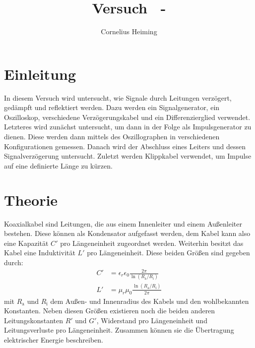 \documentclass[ngerman]{scrartcl}
\title{Versuch \nummer~-  \titel}
\date{\datum}
\author{Cornelius Heiming}
\theoremstyle{definition}
\begin{document}
	\maketitle
	
	
	\section{Einleitung}
		In diesem Versuch wird untersucht, wie Signale durch Leitungen verzögert, gedämpft und reflektiert werden. Dazu werden ein Signalgenerator, ein Oszilloskop, verschiedene Verzögerungskabel und ein Differenzierglied verwendet. Letzteres wird zunächst untersucht, um dann in der Folge als Impulsgenerator zu dienen. Diese werden dann mittels des Oszillographen in verschiedenen Konfigurationen gemessen. Danach wird der Abschluss eines Leiters und dessen Signalverzögerung untersucht. Zuletzt werden Klippkabel verwendet, um Impulse auf eine definierte Länge zu kürzen.
	
	
		\section{Theorie}
		
		Koaxialkabel sind Leitungen, die aus einem Innenleiter und einem Außenleiter bestehen. Diese können als Kondensator aufgefasst werden, dem Kabel kann also eine Kapazität $C'$ pro Längeneinheit zugeordnet werden. Weiterhin besitzt das Kabel eine Induktivität $L'$ pro Längeneinheit. Diese beiden Größen sind gegeben durch:
		\begin{align*}
			C' &= \epsilon_r \epsilon_0\frac{2 \pi}{\ln({R_\mathrm{a}/R_\mathrm{i}})}\\
			L' &= \mu_r \mu_0\frac{\ln({R_\mathrm{a}/R_\mathrm{i}})}{2 \pi}
		\end{align*}
		mit $R_\mathrm{a}$ und $R_\mathrm{i}$ dem Außen- und Innenradius des Kabels und den wohlbekannten Konstanten. Neben diesen Größen existieren noch die beiden anderen Leitungskonstanten $R'$ und $G'$, Widerstand pro Längeneinheit und Leitungsverluste pro Längeneinheit. Zusammen können sie die Übertragung elektrischer Energie beschreiben. 
\end{document}
